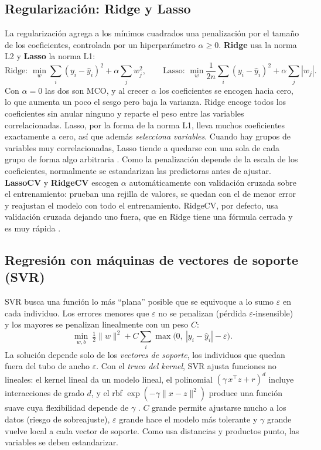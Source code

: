 \documentclass[11pt,a4paper]{article}
\let\citepOriginal\citep
\renewcommand*{\citep}[1]{\textbf{\citepOriginal{#1}}}%
\begin{document}
\subsection{Regularización: Ridge y Lasso}
La regularización agrega a los mínimos cuadrados una penalización por el tamaño de los coeficientes, controlada por un hiperparámetro $\alpha\ge0$. \textbf{Ridge} \citep{hoerl1970} usa la norma L2 y \textbf{Lasso} \citep{tibshirani1996} la norma L1:
\[
\text{Ridge: }\min_w \sum_i (y_i-\hat y_i)^2+\alpha\sum_j w_j^2 ,\qquad
\text{Lasso: }\min_w \frac{1}{2n}\sum_i (y_i-\hat y_i)^2+\alpha\sum_j |w_j| .
\]
Con $\alpha=0$ las dos son MCO, y al crecer $\alpha$ los coeficientes se encogen hacia cero, lo que aumenta un poco el sesgo pero baja la varianza. Ridge encoge todos los coeficientes sin anular ninguno y reparte el peso entre las variables correlacionadas. Lasso, por la forma de la norma L1, lleva muchos coeficientes exactamente a cero, así que además \textit{selecciona variables}. Cuando hay grupos de variables muy correlacionadas, Lasso tiende a quedarse con una sola de cada grupo de forma algo arbitraria \citep{zou2005}. Como la penalización depende de la escala de los coeficientes, normalmente se estandarizan las predictoras antes de ajustar. \textbf{LassoCV} y \textbf{RidgeCV} escogen $\alpha$ automáticamente con validación cruzada sobre el entrenamiento: prueban una rejilla de valores, se quedan con el de menor error y reajustan el modelo con todo el entrenamiento. RidgeCV, por defecto, usa validación cruzada dejando uno fuera, que en Ridge tiene una fórmula cerrada y es muy rápida \citep{hastie2009}.

\subsection{Regresión con máquinas de vectores de soporte (SVR)}
SVR \citep{drucker1997,smola2004} busca una función lo más ``plana'' posible que se equivoque a lo sumo $\varepsilon$ en cada individuo. Los errores menores que $\varepsilon$ no se penalizan (pérdida $\varepsilon$-insensible) y los mayores se penalizan linealmente con un peso $C$:
\[
\min_{w,b}\ \tfrac12\lVert w\rVert^2 + C\sum_i \max\big(0,\ |y_i-\hat y_i|-\varepsilon\big).
\]
La solución depende solo de los \textit{vectores de soporte}, los individuos que quedan fuera del tubo de ancho $\varepsilon$. Con el \textit{truco del kernel}, SVR ajusta funciones no lineales: el kernel lineal da un modelo lineal, el polinomial $(\gamma\,x^\top z+r)^d$ incluye interacciones de grado $d$, y el rbf $\exp(-\gamma\lVert x-z\rVert^2)$ produce una función suave cuya flexibilidad depende de $\gamma$ \citep{smola2004}. $C$ grande permite ajustarse mucho a los datos (riesgo de sobreajuste), $\varepsilon$ grande hace el modelo más tolerante y $\gamma$ grande vuelve local a cada vector de soporte. Como usa distancias y productos punto, las variables se deben estandarizar.
\end{document}
